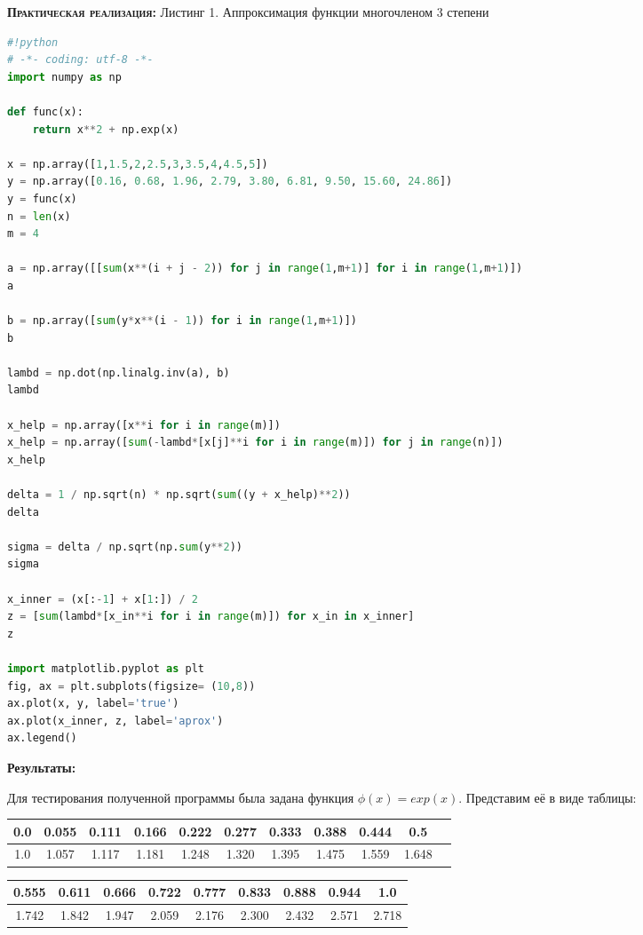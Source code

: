 \documentclass [12pt]{article}
\begin{document}
\textsc{\textbf{Практическая реализация:}}
Листинг 1. Аппроксимация функции многочленом 3 степени
\begin{lstlisting}[language=python]
#!python
# -*- coding: utf-8 -*-
import numpy as np

def func(x):
    return x**2 + np.exp(x)

x = np.array([1,1.5,2,2.5,3,3.5,4,4.5,5])
y = np.array([0.16, 0.68, 1.96, 2.79, 3.80, 6.81, 9.50, 15.60, 24.86])
y = func(x)
n = len(x)
m = 4

a = np.array([[sum(x**(i + j - 2)) for j in range(1,m+1)] for i in range(1,m+1)])
a

b = np.array([sum(y*x**(i - 1)) for i in range(1,m+1)])
b

lambd = np.dot(np.linalg.inv(a), b)
lambd

x_help = np.array([x**i for i in range(m)])
x_help = np.array([sum(-lambd*[x[j]**i for i in range(m)]) for j in range(n)])
x_help

delta = 1 / np.sqrt(n) * np.sqrt(sum((y + x_help)**2))
delta

sigma = delta / np.sqrt(np.sum(y**2))
sigma

x_inner = (x[:-1] + x[1:]) / 2
z = [sum(lambd*[x_in**i for i in range(m)]) for x_in in x_inner]
z

import matplotlib.pyplot as plt
fig, ax = plt.subplots(figsize= (10,8))
ax.plot(x, y, label='true')
ax.plot(x_inner, z, label='aprox')
ax.legend()

\end{lstlisting}
\textbf{Результаты:}

Для тестирования полученной программы была задана функция $\phi(x) = exp(x)$. Представим её в виде таблицы:

\begin{table}[h]
\begin{center}
\begin{tabular}{|c|c|c|c|c|c|c|c|c|c|c|}
\hline
0.0 & 0.055 & 0.111 & 0.166 & 0.222 & 0.277 & 0.333 & 0.388 & 0.444 & 0.5\\
\hline
1.0 & 1.057 & 1.117 & 1.181 & 1.248 & 1.320 & 1.395 & 1.475 & 1.559 & 1.648\\
\hline
\end{tabular}
\end{center}
\end{table}

\begin{table}[h]
\begin{center}
\begin{tabular}{|c|c|c|c|c|c|c|c|c|}
\hline
0.555 & 0.611 & 0.666 & 0.722 & 0.777 & 0.833 & 0.888 & 0.944 & 1.0 \\
\hline
1.742 & 1.842 & 1.947 & 2.059 & 2.176 & 2.300 & 2.432 & 2.571 & 2.718 \\
\hline
\end{tabular}
\end{center}
\end{table}
\end{document}
